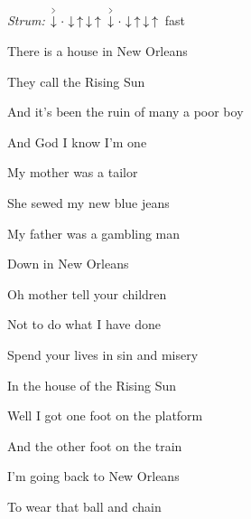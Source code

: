 \begin{song}


\begin{headerbox}
\RaiseBoxWithAccents
{} \quad
\textit{Strum:} $\AccentDown\Miss\Down\Up\Down\Up\ \AccentDown\Miss\Down\Up\Down\Up$ fast
\end{headerbox}

\begin{hchordbox}
\end{hchordbox}

\Large

\bigskip

    \par
{}    \par

\bigskip

There is a house in New Orleans  \par
They call the Rising Sun  \par
And it’s been the ruin of many a poor boy  \par
And God I know I’m one  \par

\bigskip

My mother was a tailor  \par
She sewed my new blue jeans  \par
My father was a gambling man \par
{}Down in New Orleans  \par

\bigskip

Oh mother tell your children  \par
Not to do what I have done  \par
{}Spend your lives in sin and misery \par
In the house of the Rising Sun  \par

\bigskip

Well I got one foot  on the platform  \par
And the other foot on the train  \par
I’m going back to New Orleans  \par
To wear that ball and chain  \par


\end{song}
